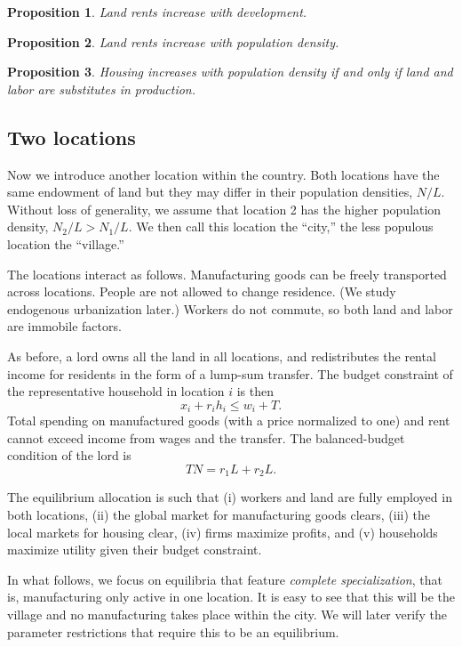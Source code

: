 \documentclass[12pt]{article}
\newtheorem{proposition}{Proposition}
\begin{document}
\begin{proposition}
Land rents increase with development.
\end{proposition}
\begin{proposition}
Land rents increase with population density.
\end{proposition}
\begin{proposition}
Housing increases with population density if and only if land and labor are substitutes in production.
\end{proposition}

\subsection{Two locations}
Now we introduce another location within the country. Both  locations have the same endowment of land but they may differ in their population densities, $N/L$. Without loss of generality, we assume that location 2 has the higher population density, $N_2/L>N_1/L$. We then call this location the ``city,'' the less populous location the ``village.''

The locations interact as follows. Manufacturing goods can be freely transported across locations. People are not allowed to change residence. (We study endogenous urbanization later.) Workers do not commute, so both land and labor are immobile factors.

As before, a lord owns all the land in all locations, and redistributes the rental income for residents in the form of a lump-sum transfer. The budget constraint of the representative household in location $i$ is then
\[
x_i + r_i h_i \le w_i + T.
\]
Total spending on manufactured goods (with a price normalized to one) and rent cannot exceed income from wages and the transfer. The balanced-budget condition of the lord is
\[
TN = r_1L+r_2L.
\]

The equilibrium allocation is such that (i) workers and land are fully employed in both locations, (ii) the global market for manufacturing goods clears, (iii) the local markets for housing clear, (iv) firms maximize profits, and (v) households maximize utility given their budget constraint.

In what follows, we focus on equilibria that feature \emph{complete specialization}, that is, manufacturing only active in one location. It is easy to see that this will be the village and no manufacturing takes place within the city. We will later verify the parameter restrictions that require this to be an equilibrium.
\end{document}
